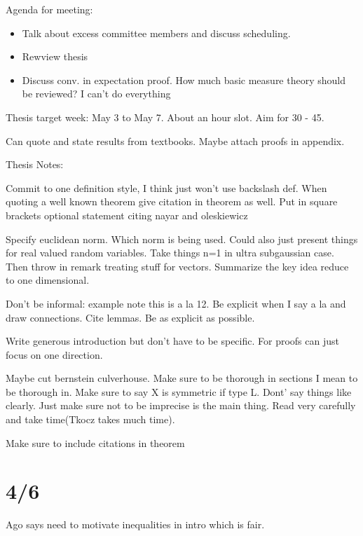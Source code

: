 \documentclass[11pt]{article}
\theoremstyle{remark}
\begin{document}
Agenda for meeting:

\begin{itemize}
	\item Talk about excess committee members and discuss scheduling.
	\item Rewview thesis
	\item Discuss conv. in expectation proof. How much basic measure theory should be reviewed? I can't do everything
\end{itemize}

Thesis target week: May 3 to May 7. About an hour slot. Aim for 30 - 45. 

Can quote and state results from textbooks. Maybe attach proofs in appendix. 

Thesis Notes:

Commit to one definition style, I think just won't use backslash def. When quoting a well known theorem give citation in theorem as well. Put in square brackets optional statement citing nayar and oleskiewicz

Specify euclidean norm. Which norm is being used. Could also just present things for real valued random variables. Take things n=1 in ultra subgaussian case. Then throw in remark treating stuff for vectors. Summarize the key idea reduce to one dimensional. 

Don't be informal: example note this is a la 12. Be explicit when I say a la and draw connections. Cite lemmas. Be as explicit as possible.

Write generous introduction but don't have to be specific. For proofs can just focus on one direction. 

Maybe cut bernstein culverhouse. Make sure to be thorough in sections I mean to be thorough in. Make sure to say X is symmetric if type L. Dont' say things like clearly. Just make sure not to be imprecise is the main thing. Read very carefully and take time(Tkocz takes much time). 

Make sure to include citations in theorem

\section{4/6}

Ago says need to motivate inequalities in intro which is fair. 
	
\end{document}
